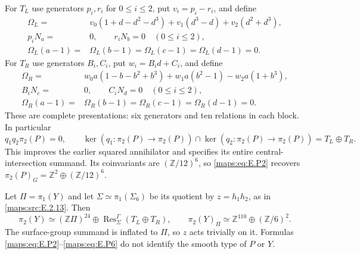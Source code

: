 \begin{theorem}
For $T_L$ use generators $p_i,r_i$ for $0\leq i\leq2$,
put $v_i=p_i-r_i$, and define
\[
 \begin{split}
 \Omega_L={}&v_0(1+d-d^2-d^3)
       +v_1(d^3-d)+v_2(d^2+d^3),\\
 p_iN_a={}&0,\qquad r_iN_b=0\quad(0\leq i\leq2),\\
 \Omega_L(a-1)={}&\Omega_L(b-1)
       =\Omega_L(c-1)=\Omega_L(d-1)=0.
 \end{split}
 \tag{E.P3}\label{maps:eq:E.P3}
\]
For $T_R$ use generators $B_i,C_i$, put $w_i=B_id+C_i$,
and define
\[
 \begin{split}
 \Omega_R={}&w_0a(1-b-b^2+b^3)
              +w_1a(b^2-1)-w_2a(1+b^3),\\
 B_iN_c={}&0,\qquad C_iN_d=0\quad(0\leq i\leq2),\\
 \Omega_R(a-1)={}&\Omega_R(b-1)
       =\Omega_R(c-1)=\Omega_R(d-1)=0.
 \end{split}
 \tag{E.P4}\label{maps:eq:E.P4}
\]
These are complete presentations: six generators and
ten relations in each block. In particular
\[
 q_1q_2\pi_2(P)=0,\qquad
 \ker(q_1:\pi_2(P)\to\pi_2(P))
  \cap\ker(q_2:\pi_2(P)\to\pi_2(P))=T_L\oplus T_R.
 \tag{E.P5}\label{maps:eq:E.P5}
\]
This improves the earlier squared annihilator and
specifies its entire central-intersection summand.
Its coinvariants are $(\mathbb Z/12)^6$, so \eqref{maps:eq:E.P2}
recovers $\pi_2(P)_G=\mathbb Z^2\oplus(\mathbb Z/12)^6$.

Let $\Pi=\pi_1(Y)$ and let $\Sigma\simeq\pi_1(\Sigma_6)$
be its quotient by $z=h_1h_2$, as in \ref{maps:src:E.2.13}. Then
\[
 \pi_2(Y)\simeq(\mathbb Z\Pi)^{24}
          \oplus\operatorname{Res}^{\Gamma}_{\Sigma}(T_L\oplus T_R),
 \qquad
 \pi_2(Y)_\Pi\simeq\mathbb Z^{110}\oplus(\mathbb Z/6)^2.
 \tag{E.P6}\label{maps:eq:E.P6}
\]
The surface-group summand is inflated to $\Pi$, so
$z$ acts trivially on it. Formulas \eqref{maps:eq:E.P2}--\eqref{maps:eq:E.P6}
do not identify the smooth type of $P$ or $Y$.

\end{theorem}


